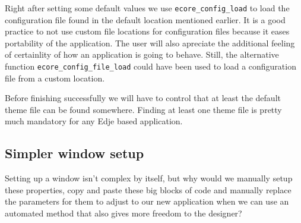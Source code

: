 \documentclass[12pt,a4paper,english]{book}
\begin{document}
Right after setting some default values we use \texttt{ecore{\_}config{\_}load} to load
the configuration file found in the default location mentioned earlier. It is
a good practice to not use custom file locations for configuration files
because it eases portability of the application. The user will also apreciate
the additional feeling of certainlity of how an application is going to behave.
Still, the alternative function \texttt{ecore{\_}config{\_}file{\_}load} could have been used
to load a configuration file from a custom location.

Before finishing successfully we will have to control that at least the default
theme file can be found somewhere. Finding at least one theme file is pretty
much mandatory for any Edje based application.



\hypertarget{simpler-window-setup}{}
\subsection{Simpler window setup}

Setting up a window isn't complex by itself, but why would we manually setup
these properties, copy and paste these big blocks of code and manually
replace the parameters for them to adjust to our new application when we can
use an automated method that also gives more freedom to the designer?
\end{document}
